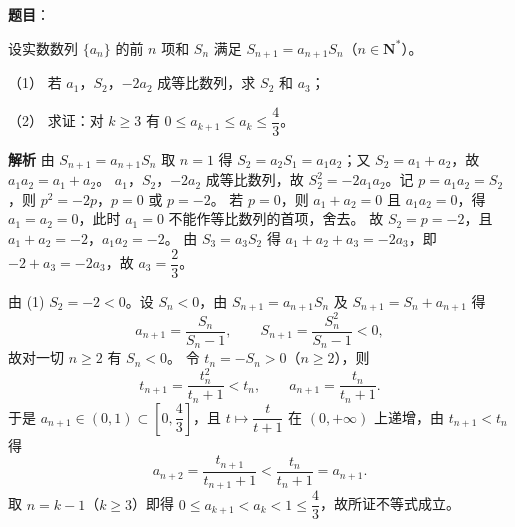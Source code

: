 \begin{answer}

\textbf{题目}：

设实数数列 $\{a_n\}$ 的前 $n$ 项和 $S_n$ 满足 $S_{n+1}=a_{n+1}S_n$（$n\in\mathbf N^*$）。

（1） 若 $a_1$，$S_2$，$-2a_2$ 成等比数列，求 $S_2$ 和 $a_3$；

（2） 求证：对 $k\geqslant3$ 有 $0\leqslant a_{k+1}\leqslant a_k\leqslant\dfrac43$。

\textbf{解析}
由 $S_{n+1}=a_{n+1}S_n$ 取 $n=1$ 得 $S_2=a_2S_1=a_1a_2$；又 $S_2=a_1+a_2$，故 $a_1a_2=a_1+a_2$。
$a_1$，$S_2$，$-2a_2$ 成等比数列，故 $S_2^2=-2a_1a_2$。记 $p=a_1a_2=S_2$，则 $p^2=-2p$，$p=0$ 或 $p=-2$。
若 $p=0$，则 $a_1+a_2=0$ 且 $a_1a_2=0$，得 $a_1=a_2=0$，此时 $a_1=0$ 不能作等比数列的首项，舍去。
故 $S_2=p=-2$，且 $a_1+a_2=-2$，$a_1a_2=-2$。
由 $S_3=a_3S_2$ 得 $a_1+a_2+a_3=-2a_3$，即 $-2+a_3=-2a_3$，故 $a_3=\dfrac23$。

由 (1) $S_2=-2<0$。设 $S_n<0$，由 $S_{n+1}=a_{n+1}S_n$ 及 $S_{n+1}=S_n+a_{n+1}$ 得
\nopagebreak[4]
\[a_{n+1}=\frac{S_n}{S_n-1},\qquad S_{n+1}=\frac{S_n^2}{S_n-1}<0,\]
故对一切 $n\geqslant2$ 有 $S_n<0$。
令 $t_n=-S_n>0$（$n\geqslant2$），则
\nopagebreak[4]
\[t_{n+1}=\frac{t_n^2}{t_n+1}<t_n,\qquad a_{n+1}=\frac{t_n}{t_n+1}.\]
于是 $a_{n+1}\in(0,1)\subset\left[0,\dfrac43\right]$，且 $t\mapsto\dfrac t{t+1}$ 在 $(0,+\infty)$ 上递增，由 $t_{n+1}<t_n$ 得
\nopagebreak[4]
\[a_{n+2}=\frac{t_{n+1}}{t_{n+1}+1}<\frac{t_n}{t_n+1}=a_{n+1}.\]
取 $n=k-1$（$k\geqslant3$）即得 $0\leqslant a_{k+1}<a_k<1\leqslant\dfrac43$，故所证不等式成立。



\end{answer}